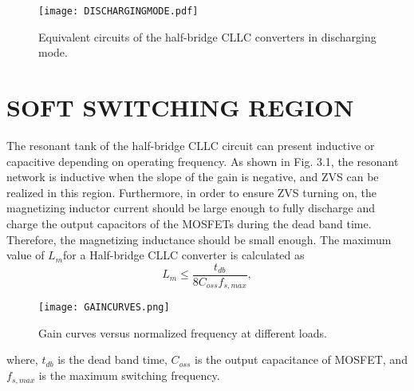 \documentclass{book}
\begin{document}
	\begin{figure}[ht]
		\centering
		\texttt{[image: DISCHARGINGMODE.pdf]} %
		\caption{Equivalent circuits of the half-bridge CLLC converters in discharging mode.}
	\end{figure}
	\paragraph{}
	\chapter{SOFT SWITCHING REGION} 
	The resonant tank of the half-bridge CLLC circuit can present inductive or capacitive depending on operating frequency. As shown in Fig. 3.1, the resonant network is inductive when the slope of the gain is negative, and ZVS can be realized in this region. Furthermore, in order to ensure ZVS turning on, the magnetizing inductor current should be large enough to fully discharge and charge the output capacitors of the MOSFETs during the dead band time. Therefore, the magnetizing inductance should be small enough. The maximum value of \( L_{m}  \)for a Half-bridge CLLC converter is calculated as
  \begin{equation*} L_{m} \leq\frac{t_{db}}{8C_{oss}f_{s, max}},  \end{equation*}
    \begin{figure}[ht]
		\centering
		\texttt{[image: GAINCURVES.png]} %
		\caption{Gain curves versus normalized frequency  at different loads.}
	\end{figure}
    
    where, \( t_{db}  \) is the dead band time, \( C_{oss}  \) is the output capacitance of MOSFET, and \( f_{s,max}  \) is the maximum switching frequency.
\end{document}
